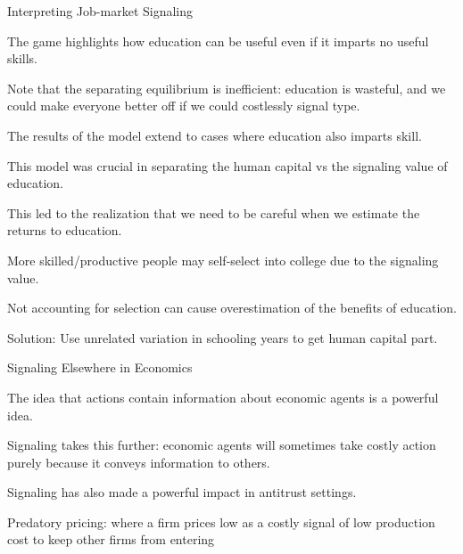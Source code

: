 \documentclass[aspectratio=169]{beamer}
\newenvironment{wideitemize}{\itemize\addtolength{\itemsep}{10pt}}{\enditemize}
\begin{document}
\begin{frame}{Interpreting Job-market Signaling}

\begin{wideitemize}
    \item The game highlights how education can be useful even if it imparts no useful skills.
    \item Note that the separating equilibrium is inefficient: education is wasteful, and we could make everyone better off if we could costlessly signal type.
    \item The results of the model extend to cases where education also imparts skill.
    \item This model was crucial in separating the human capital vs the signaling value of education.
    \item  This led to the realization that we need to be careful when we estimate the returns to education.
    \item More skilled/productive people may self-select into college due to the signaling value.
    \item Not accounting for selection can cause overestimation of the benefits of education.
    \item Solution: Use unrelated variation in schooling years to get human capital part.
\end{wideitemize}
    
\end{frame}

\begin{frame}{Signaling Elsewhere in Economics}

\begin{wideitemize}
    \item The idea that actions contain information about economic agents is a powerful idea.
    \item Signaling takes this further: economic agents will sometimes take costly action purely because it conveys information to others.
    \item Signaling has also made a powerful impact in antitrust settings.
    \item Predatory pricing: where a firm prices low as a costly signal of low production cost to keep other firms from entering
\end{wideitemize}
    
\end{frame}
\end{document}
